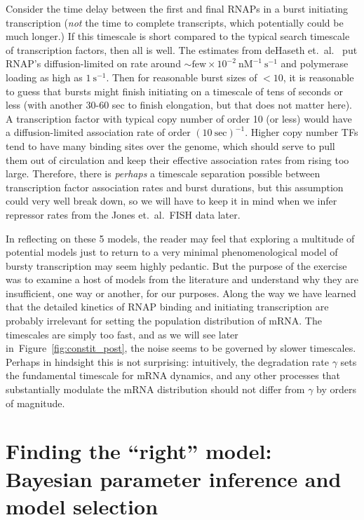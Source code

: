 \documentclass[12pt]{article}%
\newcommand{\fig}[1]{Figure~\ref{#1}}
\begin{document}
Consider the time delay between the first and final RNAPs
in a burst initiating transcription
(\textit{not} the time to complete transcripts,
which potentially could be much longer.)
If this timescale is short compared to the typical
search timescale of transcription factors, then all is well.
The estimates from deHaseth et.\ al.~\cite{DeHaseth1998}
put RNAP's diffusion-limited on rate around
$\sim\text{few}\times10^{-2}~\text{nM}^{-1}~\text{s}^{-1}$
and polymerase loading as high as $1~\text{s}^{-1}$.
Then for reasonable burst sizes of $<10$, it is reasonable to guess that
bursts might finish initiating on a timescale of tens of seconds or less
(with another 30-60 sec to finish elongation, but that does not matter here).
A transcription factor with typical copy number of order 10 (or less)
would have a diffusion-limited association rate of order
$(10~\text{sec})^{-1}$.
Higher copy number TFs tend to have many binding sites over the genome,
which should serve to pull them out of circulation and keep their
effective association rates from rising too large.
Therefore, there is \textit{perhaps} a timescale separation
possible between transcription factor association rates and burst
durations, but this assumption could very well break down, so we
will have to keep it in mind when we infer repressor rates from
the Jones et.\ al.\ FISH data later.

In reflecting on these 5 models, the reader may feel that
exploring a multitude of potential models just to return to a
very minimal phenomenological model of bursty transcription may
seem highly pedantic. But the purpose of the exercise was to
examine a host of models from the literature and understand why
they are insufficient, one way or another, for our purposes.
Along the way we have learned that the detailed kinetics of RNAP
binding and initiating transcription are probably irrelevant for
setting the population distribution of mRNA.
The timescales are simply too fast, and as we will see later
in~\fig{fig:constit_post}, the noise seems to be governed by
slower timescales. Perhaps in hindsight this is not surprising:
intuitively, the degradation rate $\gamma$ sets the fundamental
timescale for mRNA dynamics, and any other processes that
substantially modulate the mRNA distribution should not differ
from $\gamma$ by orders of magnitude.

\section{Finding the ``right'' model: Bayesian parameter inference and model selection}
\end{document}
